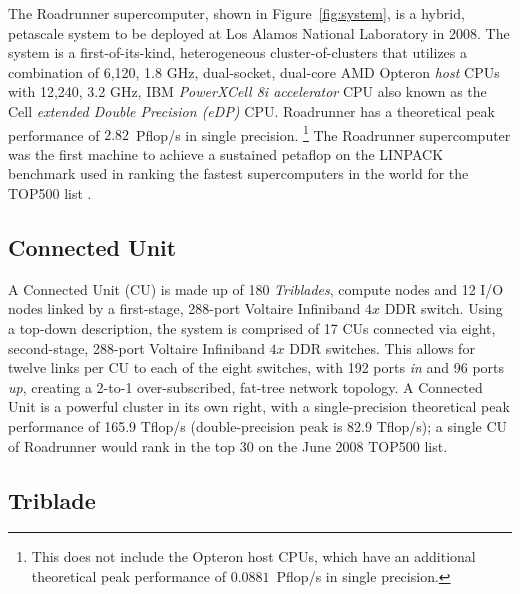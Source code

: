 \documentclass[journal,twoside]{IEEEtran}
\newcommand{\fig}[1]{Figure~\ref{fig:#1}}
\begin{document}
The Roadrunner supercomputer, shown in \fig{system}, is a hybrid,
petascale system to be deployed at Los Alamos National Laboratory in
2008.  The system is a first-of-its-kind, heterogeneous
cluster-of-clusters that utilizes a combination of 6,120, 1.8 GHz,
dual-socket, dual-core AMD Opteron \emph{host} CPUs with 12,240, 3.2
GHz, IBM \emph{PowerXCell 8i accelerator} CPU also known as the Cell
\emph{extended Double Precision (eDP)} CPU.  Roadrunner has a
theoretical peak performance of $2.82$~Pflop/s in single precision.
\footnote{This does not include the Opteron host CPUs, which have
an additional theoretical peak performance of $0.0881$~Pflop/s in
single precision.}
The Roadrunner supercomputer was the first machine to achieve a
sustained petaflop on the LINPACK benchmark used in ranking the
fastest supercomputers in the world for the TOP500 list
\cite{top500}.

\subsection{Connected Unit}

A Connected Unit (CU) is made up of 180 \emph{Triblades}, compute
nodes and 12 I/O nodes linked by a first-stage, 288-port Voltaire
Infiniband $4x$ DDR switch.  Using a top-down description, the system
is comprised of 17 CUs connected via eight, second-stage, 288-port
Voltaire Infiniband $4x$ DDR switches.  This allows for twelve links
per CU to each of the eight switches, with 192 ports
\emph{in} and 96 ports \emph{up}, creating a 2-to-1 over-subscribed,
fat-tree network topology.  A Connected Unit is a powerful cluster in
its own right, with a single-precision theoretical peak performance of
165.9 Tflop/s (double-precision peak is 82.9 Tflop/s); a single CU of
Roadrunner would rank in the top 30 on the June 2008 TOP500 list.

\subsection{Triblade}

\end{document}
